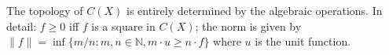 The topology of $C(X)$ is entirely determined by the algebraic operations. In detail: $f \geq 0$ iff $f$ is a square in $C(X)$; the norm is given by $\|f\| = \inf \{m/n : m, n \in \mathbb{N}, m \cdot u \geq n \cdot f\}$ where $u$ is the unit function.

